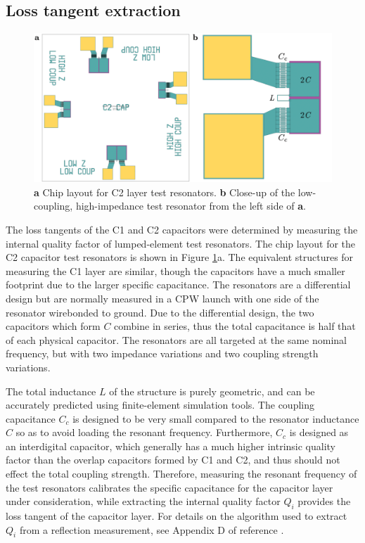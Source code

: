 \subsection{Loss tangent extraction}

\begin{figure}
\begin{center}
\includegraphics[width=6in]{twpa_exp/test_res.png}
\end{center}
\caption[Test resonator masks]{\textbf{a} Chip layout for C2 layer test resonators.  \textbf{b} Close-up of the low-coupling, high-impedance test resonator from the left side of \textbf{a}.}
\label{fig:test_res}
\end{figure}

The loss tangents of the C1 and C2 capacitors were determined by measuring the internal quality factor of lumped-element test resonators.  The chip layout for the C2 capacitor test resonators is shown in Figure \ref{fig:test_res}a.  The equivalent structures for measuring the C1 layer are similar, though the capacitors have a much smaller footprint due to the larger specific capacitance.  The resonators are a differential design but are normally measured in a CPW launch with one side of the resonator wirebonded to ground.  Due to the differential design, the two capacitors which form $C$ combine in series, thus the total capacitance is half that of each physical capacitor.  The resonators are all targeted at the same nominal frequency, but with two impedance variations and two coupling strength variations.

The total inductance $L$ of the structure is purely geometric, and can be accurately predicted using finite-element simulation tools.  The coupling capacitance $C_c$ is designed to be very small compared to the resonator inductance $C$ so as to avoid loading the resonant frequency.  Furthermore, $C_c$ is designed as an interdigital capacitor, which generally has a much higher intrinsic quality factor than the overlap capacitors formed by C1 and C2, and thus should not effect the total coupling strength.  Therefore, measuring the resonant frequency of the test resonators calibrates the specific capacitance for the capacitor layer under consideration, while extracting the internal quality factor $Q_i$ provides the loss tangent of the capacitor layer.  For details on the algorithm used to extract $Q_i$ from a reflection measurement, see Appendix D of reference \cite{Weber2014a}.

